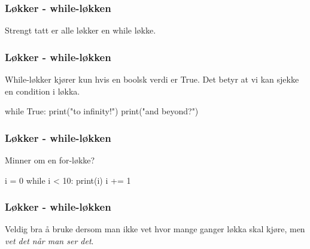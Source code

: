 
\begin{frame}
    \frametitle{Løkker - while-løkken}

    Strengt tatt er alle løkker en while løkke. 

\end{frame}

\begin{frame}[fragile]
    \frametitle{Løkker - while-løkken}

    While-løkker kjører kun hvis en boolsk verdi er True. Det betyr at vi kan sjekke en condition i løkka. 

\begin{python}
while True:
    print("to infinity!")
print("and beyond?")
\end{python}

\end{frame}

\begin{frame}[fragile]
    \frametitle{Løkker - while-løkken}

    Minner om en for-løkke? 

\begin{python}
i = 0
while i < 10:
    print(i)
    i += 1
\end{python}

\end{frame}

\begin{frame}[fragile]
    \frametitle{Løkker - while-løkken}

    Veldig bra å bruke dersom man ikke vet hvor mange ganger løkka skal kjøre, men \textit{vet det når man ser det}. 

\begin{python}

\end{python}

\end{frame}
